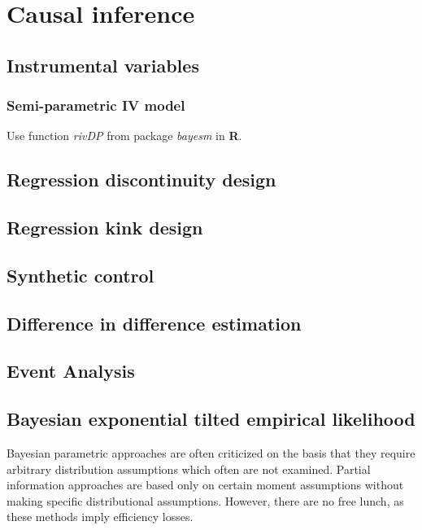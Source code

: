 \chapter{Causal inference}\label{chap12}

\section{Instrumental variables}\label{sec12_1}
\subsection{Semi-parametric IV model}\label{sec12_11}
Use function \textit{rivDP} from package \textit{bayesm} in \textbf{R}.

\section{Regression discontinuity design}\label{sec12_2}

\section{Regression kink design}\label{sec12_3}

\section{Synthetic control}\label{sec12_4}

\section{Difference in difference estimation}\label{sec12_5}

\section{Event Analysis}\label{sec12_6}

\section{Bayesian exponential tilted empirical likelihood}\label{sec12_7}
Bayesian parametric approaches are often criticized on the basis that they require arbitrary distribution assumptions which often are not examined. Partial information approaches are based only on certain moment assumptions without making specific distributional assumptions. However, there are no free lunch, as these methods imply efficiency losses.

